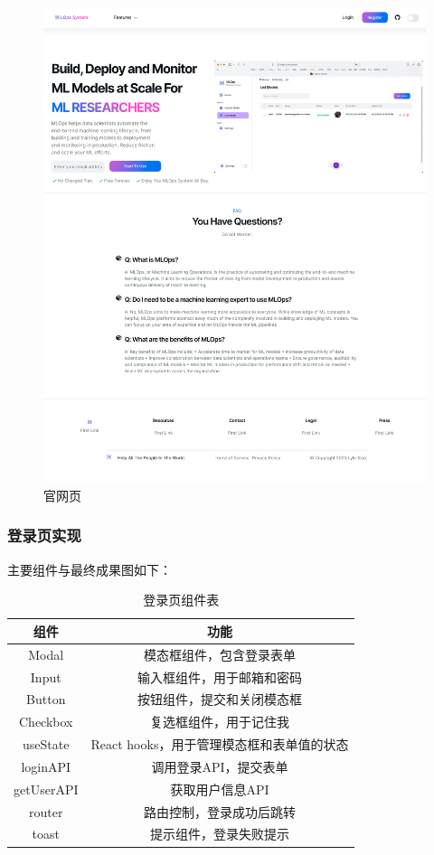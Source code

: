 \documentclass{HDU-Bachelor-Thesis}
\begin{document}
\begin{figure}[H] %
\centering %
\includegraphics[width=1\textwidth]{P-2.png} %
\caption{官网页} %
\label{图片.landing} %
\end{figure}

\subsubsection{登录页实现}

主要组件与最终成果图如下：

\begin{table}[htbp] 
\caption{登录页组件表}   
\label{table:login}
\centering
\begin{tabular}{c|c}
\hline
\textbf{组件} & \textbf{功能}\\ 
\hline
Modal & 模态框组件，包含登录表单\\
\hline
Input & 输入框组件，用于邮箱和密码   \\
\hline  
Button & 按钮组件，提交和关闭模态框\\ 
\hline
Checkbox & 复选框组件，用于记住我\\
\hline
useState & React hooks，用于管理模态框和表单值的状态\\
\hline 
loginAPI & 调用登录API，提交表单\\
\hline
getUserAPI & 获取用户信息API\\
\hline
router & 路由控制，登录成功后跳转\\
\hline 
toast & 提示组件，登录失败提示\\
\hline
\end{tabular}
\end{table}
\end{document}
